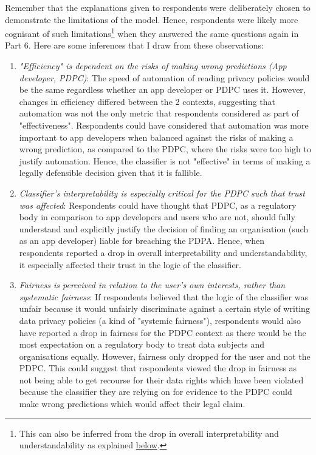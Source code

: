 Remember that the explanations given to respondents were deliberately chosen to demonstrate the limitations of the model. Hence, respondents were likely more cognisant of such limitations\footnote{This can also be inferred from the drop in overall interpretability and understandability as explained \hyperref[sec:interpret_understand]{below}.} when they answered the same questions again in Part 6. Here are some inferences that I draw from these observations:
\begin{enumerate}
    \item \textit{"Efficiency" is dependent on the risks of making wrong predictions (App developer, PDPC)}: The speed of automation of reading privacy policies would be the same regardless whether an app developer or PDPC uses it. However, changes in efficiency differed between the 2 contexts, suggesting that automation was not the only metric that respondents considered as part of "effectiveness". Respondents could have considered that automation was more important to app developers when balanced against the risks of making a wrong prediction, as compared to the PDPC, where the risks were too high to justify automation. Hence, the classifier is not "effective" in terms of making a legally defensible decision given that it is fallible.
    \item \textit{Classifier's interpretability is especially critical for the PDPC such that trust was affected}: Respondents could have thought that PDPC, as a regulatory body in comparison to app developers and users who are not, should fully understand and explicitly justify the decision of finding an organisation (such as an app developer) liable for breaching the PDPA. Hence, when respondents reported a drop in overall interpretability and understandability, it especially affected their trust in the logic of the classifier.
    \item \textit{Fairness is perceived in relation to the user's own interests, rather than systematic fairness}: If respondents believed that the logic of the classifier was unfair because it would unfairly discriminate against a certain style of writing data privacy policies (a kind of "systemic fairness"), respondents would also have reported a drop in fairness for the PDPC context as there would be the most expectation on a regulatory body to treat data subjects and organisations equally. However, fairness only dropped for the user and not the PDPC. This could suggest that respondents viewed the drop in fairness as not being able to get recourse for their data rights which have been violated because the classifier they are relying on for evidence to the PDPC could make wrong predictions which would affect their legal claim.

\end{enumerate}
